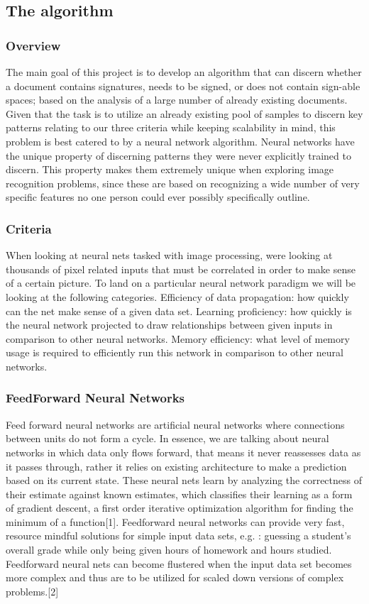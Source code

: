 \documentclass[article, onecolumn, draftclsnofoot,10pt, compsoc]{IEEEtran}
\begin{document}
\subsection{The algorithm}

\subsubsection{Overview}
The main goal of this project is to develop an algorithm that can discern whether a document contains signatures, needs to be signed, or does not contain sign-able spaces; based on the analysis of a large number of already existing documents. Given that the task is to utilize an already existing pool of samples to discern key patterns relating to our three criteria while keeping scalability in mind, this problem is best catered to by a neural network algorithm. Neural networks have the unique property of discerning patterns they were never explicitly trained to discern. This property makes them extremely unique when exploring image recognition problems, since these are based on recognizing a wide number of very specific features no one person could ever possibly specifically outline. 

\subsubsection{Criteria}
When looking at neural nets tasked with image processing, were looking at thousands of pixel related inputs that must be correlated in order to make sense of a certain picture. To land on a particular neural network paradigm we will be looking at the following categories. Efficiency of data propagation: how quickly can the net make sense of a given data set. Learning proficiency: how quickly is the neural network projected to draw relationships between given inputs in comparison to other neural networks. Memory efficiency: what level of memory usage is required to efficiently run this network in comparison to other neural networks. 

\subsubsection{FeedForward Neural Networks}
Feed forward neural networks are artificial neural networks where connections between units do not form a cycle. In essence, we are talking about neural networks in which data only flows forward, that means it never reassesses data as it passes through, rather it relies on existing architecture to make a prediction based on its current state. These neural nets learn by analyzing the correctness of their estimate against known estimates, which classifies their learning as a form of gradient descent, a first order iterative optimization algorithm for finding the minimum of a function[1]. Feedforward neural networks can provide very fast, resource mindful solutions for simple input data sets, e.g. : guessing a student's overall grade while only being given hours of homework and hours studied. Feedforward neural nets can become flustered when the input data set becomes more complex and thus are to be utilized for scaled down versions of complex problems.[2]
\end{document}
